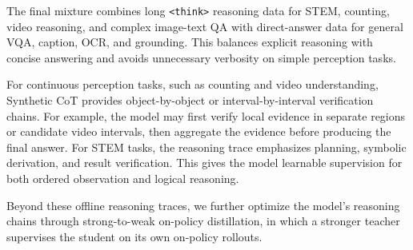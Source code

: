 \documentclass{article} %
\begin{document}
The final mixture combines long \texttt{<think>} reasoning data for STEM, counting, video reasoning, and complex image-text QA with direct-answer data for general VQA, caption, OCR, and grounding. This balances explicit reasoning with concise answering and avoids unnecessary verbosity on simple perception tasks.

For continuous perception tasks, such as counting and video understanding, Synthetic CoT provides object-by-object or interval-by-interval verification chains. For example, the model may first verify local evidence in separate regions or candidate video intervals, then aggregate the evidence before producing the final answer. For STEM tasks, the reasoning trace emphasizes planning, symbolic derivation, and result verification. This gives the model learnable supervision for both ordered observation and logical reasoning. 

Beyond these offline reasoning traces, we further optimize the model's reasoning chains through strong-to-weak on-policy distillation, in which a stronger teacher supervises the student on its own on-policy rollouts.



\end{document}
